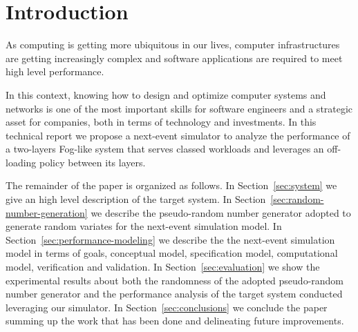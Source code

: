 \section{Introduction}
\label{sec:introduction}


As computing is getting more ubiquitous in our lives, computer infrastructures are getting increasingly complex and software applications are required to meet high level performance.

%
In this context, knowing how to design and optimize computer systems and networks is one of the most important skills for software engineers and a strategic asset for companies, both in terms of technology and investments.
%
In this technical report we propose a next-event simulator to analyze the performance of a two-layers Fog-like system that serves classed workloads and leverages an off-loading policy between its layers.


The remainder of the paper is organized as follows.
%
In Section~\ref{sec:system} we give an high level description of the target system.
%
In Section~\ref{sec:random-number-generation} we describe the pseudo-random number generator adopted to generate random variates for the next-event simulation model.
%
In Section~\ref{sec:performance-modeling} we describe the the next-event simulation model in terms of goals, conceptual model, specification model, computational model, verification and validation.
%
In Section~\ref{sec:evaluation} we show the experimental results about both the randomness of the adopted pseudo-random number generator and the performance analysis of the target system conducted leveraging our simulator.
%
%
In Section~\ref{sec:conclusions} we conclude the paper summing up the work that has been done and delineating future improvements.
